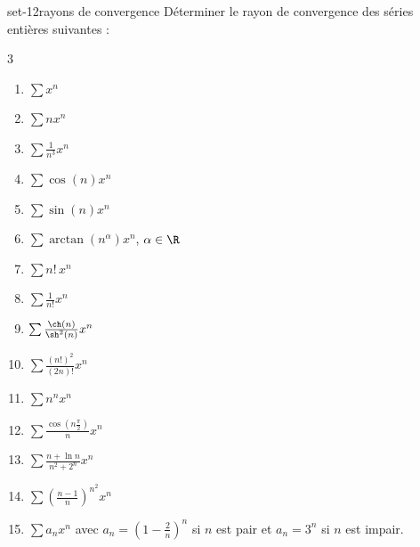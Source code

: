 
\begin{exo}{set-1}{2}{rayons de convergence}
Déterminer le rayon de convergence des séries entières suivantes :
\begin{multicols}{3}
\begin{enumerate}
\item $\sum x^n$
\item $\sum nx^n$
\item $\sum\frac1{n^3}x^n$
\item $\sum\cos(n)x^n$
\item $\sum\sin(n)x^n$
\item $\sum\arctan(n^\alpha)x^n$, $\alpha\in\R$
\item $\sum n!\,x^n$
\item $\sum\frac1{n!}x^n$
\item $\sum\frac{\ch(n)}{\sh^2(n)}x^n$
\item $\sum\frac{(n!)^2}{(2n)!}x^n$
\item $\sum n^nx^n$
\item $\sum\frac{\cos(n\frac\pi2)}nx^n$
\item $\sum\frac{n+\ln n}{n^2+2^n}x^n$
\item $\sum\left(\frac{n-1}n\right)^{n^2}x^n$
\end{enumerate}
\end{multicols}
\begin{enumerate}\setcounter{enumi}{14}
\item $\sum a_nx^n$ avec $a_n=\left(1-\frac2n\right)^n$ si $n$ est pair et $a_n=3^n$ si $n$ est impair.
\end{enumerate}
\end{exo}

